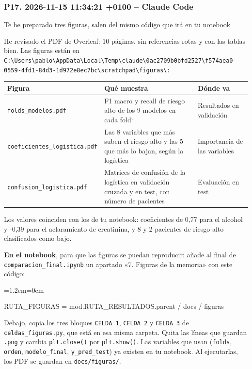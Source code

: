 \documentclass[11pt,a4paper]{article}
\newenvironment{codigo}
  {\par\smallskip\begin{list}{}{\leftmargin=1.2em\rightmargin=0em}\item\relax\ttfamily\scriptsize\raggedright}
  {\end{list}\smallskip}
\begin{document}
\subsubsection*{P17. 2026-11-15 11:34:21 +0100 -- Claude Code}
{\small
Te he preparado tres figuras, salen del mismo código que irá en tu notebook

He revisado el PDF de Overleaf: 10 páginas, sin referencias rotas y con las tablas bien. Las figuras están en \texttt{C:\textbackslash\allowbreak{}Users\textbackslash\allowbreak{}pablo\textbackslash\allowbreak{}AppData\textbackslash\allowbreak{}Local\textbackslash\allowbreak{}Temp\textbackslash\allowbreak{}claude\textbackslash\allowbreak{}0ac2709b0bfd2527\textbackslash\allowbreak{}f574aea0-0559-4fd1-84d3-1d972e8ec7bc\textbackslash\allowbreak{}scratchpad\textbackslash\allowbreak{}figuras\textbackslash\allowbreak{}:}

{\footnotesize\noindent\begin{tabularx}{\linewidth}{>{\raggedright\arraybackslash}X>{\raggedright\arraybackslash}X>{\raggedright\arraybackslash}X}
\toprule
\textbf{\textbf{Figura}} & \textbf{\textbf{Qué muestra}} & \textbf{\textbf{Dónde va}} \\
\midrule
\texttt{folds\_\allowbreak{}modelos.pdf} & F1 macro y recall de riesgo alto de los 9 modelos en cada fold` & Resultados en validación \\
\texttt{coeficientes\_\allowbreak{}logistica.pdf} & Las 8 variables que más suben el riesgo alto y las 5 que más lo bajan, según la logística & Importancia de las variables \\
\texttt{confusion\_\allowbreak{}logistica.pdf} & Matrices de confusión de la logística en validación cruzada y en test, con número de pacientes & Evaluación en test \\
\bottomrule
\end{tabularx}}

Los valores coinciden con los de tu notebook: coeficientes de 0,77 para el alcohol y -0,39 para el aclaramiento de creatinina, y 8 y 2 pacientes de riesgo alto clasificados como bajo.

\textbf{En el notebook}, para que las figuras se puedan reproducir: añade al final de \texttt{comparacion\_\allowbreak{}final.ipynb} un apartado «7. Figuras de la memoria» con este código:

\begin{codigo}
RUTA\_\allowbreak{}FIGURAS = mod.RUTA\_\allowbreak{}RESULTADOS.parent /\allowbreak{} \textquotedbl{}docs\textquotedbl{} /\allowbreak{} \textquotedbl{}figuras\textquotedbl{}
\end{codigo}
Debajo, copia los tres bloques \texttt{CELDA 1}, \texttt{CELDA 2} y \texttt{CELDA 3} de \texttt{celdas\_\allowbreak{}figuras.py}, que está en esa misma carpeta. Quita las líneas que guardan \texttt{.png} y cambia \texttt{plt.close()} por \texttt{plt.show()}. Las variables que usan (\texttt{folds}, \texttt{orden}, \texttt{modelo\_\allowbreak{}final}, \texttt{y\_\allowbreak{}pred\_\allowbreak{}test}) ya existen en tu notebook. Al ejecutarlas, los PDF se guardan en \texttt{docs/\allowbreak{}figuras/\allowbreak{}}.

}
\end{document}
